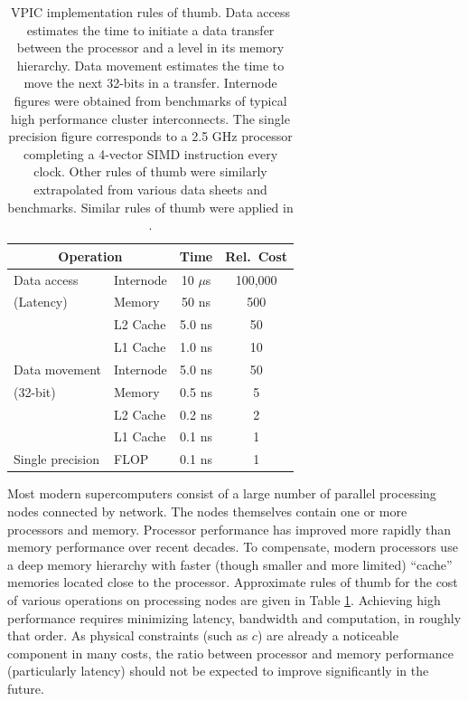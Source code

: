 \documentclass[aps,prl,preprint,preprintnumbers,groupedaddress]{revtex4}
\newcommand{\tbl}[1]{Table \ref{tbl:#1}}
\begin{document}
\begin{table}
\begin{tabular}{l l || c | c}
\multicolumn{2}{c||}{Operation} & Time & Rel.~Cost \\
\hline
\hline
Data access      & Internode & 10 $\mu$s & 100,000 \\
(Latency)        & Memory    & 50 ns     & 500     \\
                 & L2 Cache  & 5.0 ns    & 50      \\
                 & L1 Cache  & 1.0 ns    & 10      \\
\hline
Data movement    & Internode & 5.0 ns    & 50      \\
(32-bit)         & Memory    & 0.5 ns    & 5       \\
                 & L2 Cache  & 0.2 ns    & 2       \\
                 & L1 Cache  & 0.1 ns    & 1       \\
\hline
Single precision & FLOP      & 0.1 ns    & 1
\end{tabular}
\caption{\label{tbl:Rules_of_thumb}
VPIC implementation rules of thumb.  Data access estimates the time to
initiate a data transfer between the processor and a level in its
memory hierarchy.  Data movement estimates the time to move the next
32-bits in a transfer.  Internode figures were obtained from
benchmarks of typical high performance cluster interconnects.  The
single precision figure corresponds to a 2.5 GHz processor completing
a 4-vector SIMD instruction every clock.  Other rules of thumb were
similarly extrapolated from various data sheets and benchmarks.
Similar rules of thumb were applied in \cite{Bowers_et_al_2006}.}
\end{table}

Most modern supercomputers consist of a large number of parallel
processing nodes connected by network.  The nodes themselves contain
one or more processors and memory.  Processor performance has improved
more rapidly than memory performance over recent decades.  To
compensate, modern processors use a deep memory hierarchy with faster
(though smaller and more limited) ``cache'' memories located close to
the processor.  Approximate rules of thumb for the cost of various
operations on processing nodes are given in \tbl{Rules_of_thumb}.
Achieving high performance requires minimizing latency, bandwidth and
computation, in roughly that order.  As physical constraints (such as
$c$) are already a noticeable component in many costs, the ratio
between processor and memory performance (particularly latency) should
not be expected to improve significantly in the future.
\end{document}
